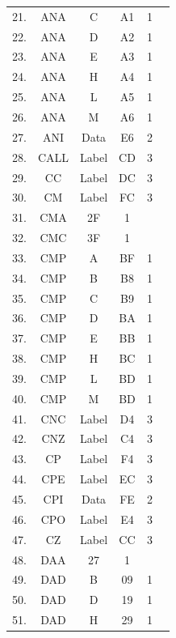 \documentclass{scrreprt}
\begin{document}
\begin{longtable}{|c|c|c|c|c|c|}
21.  & ANA  & C            & A1   & 1  &   \\
22.  & ANA  & D            & A2   & 1  &   \\
23.  & ANA  & E            & A3   & 1  &   \\
24.  & ANA  & H            & A4   & 1  &   \\
25.  & ANA  & L            & A5   & 1  &   \\
26.  & ANA  & M            & A6   & 1  &   \\
27.  & ANI  & Data         & E6   & 2  &   \\
28.  & CALL & Label        & CD   & 3  &   \\
29.  & CC   & Label        & DC   & 3  &   \\
30.  & CM   & Label        & FC   & 3  &   \\
31.  & CMA  & 2F           & 1    &    &   \\
32.  & CMC  & 3F           & 1    &    &   \\
33.  & CMP  & A            & BF   & 1  &   \\
34.  & CMP  & B            & B8   & 1  &   \\
35.  & CMP  & C            & B9   & 1  &   \\
36.  & CMP  & D            & BA   & 1  &   \\
37.  & CMP  & E            & BB   & 1  &   \\
38.  & CMP  & H            & BC   & 1  &   \\
39.  & CMP  & L            & BD   & 1  &   \\
40.  & CMP  & M            & BD   & 1  &   \\
41.  & CNC  & Label        & D4   & 3  &   \\
42.  & CNZ  & Label        & C4   & 3  &   \\
43.  & CP   & Label        & F4   & 3  &   \\
44.  & CPE  & Label        & EC   & 3  &   \\
45.  & CPI  & Data         & FE   & 2  &   \\
46.  & CPO  & Label        & E4   & 3  &   \\
47.  & CZ   & Label        & CC   & 3  &   \\
48.  & DAA  & 27           & 1    &    &   \\
49.  & DAD  & B            & 09   & 1  &   \\
50.  & DAD  & D            & 19   & 1  &   \\
51.  & DAD  & H            & 29   & 1  &   \\

\end{longtable}
\end{document}
